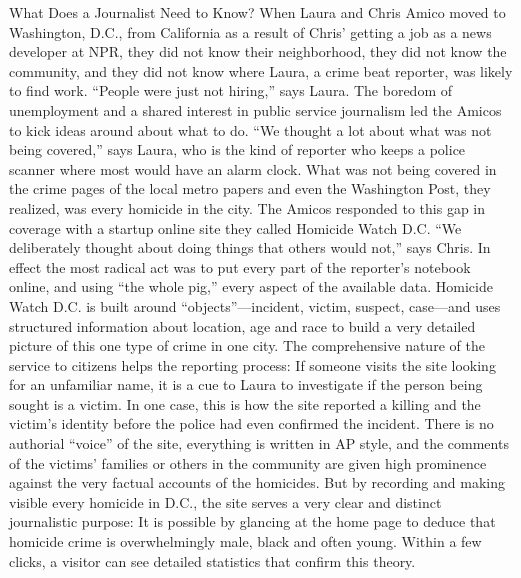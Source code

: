What Does a Journalist Need to Know?
When Laura and Chris Amico moved to Washington, D.C., from California as
a result of Chris’ getting a job as a news developer at NPR, they did not know
their neighborhood, they did not know the community, and they did not know
where Laura, a crime beat reporter, was likely to find work.
``People were just not hiring,'' says Laura. The boredom of unemployment and a
shared interest in public service journalism led the Amicos to kick ideas around
about what to do. ``We thought a lot about what was not being covered,'' says
Laura, who is the kind of reporter who keeps a police scanner where most would
have an alarm clock.
What was not being covered in the crime pages of the local metro papers and
even the Washington Post, they realized, was every homicide in the city. The
Amicos responded to this gap in coverage with a startup online site they called
Homicide Watch D.C. ``We deliberately thought about doing things that others
would not,'' says Chris. In effect the most radical act was to put every part of the
reporter’s notebook online, and using ``the whole pig,'' every aspect of the available
data. Homicide Watch D.C. is built around ``objects''—incident, victim, suspect,
case—and uses structured information about location, age and race to build
a very detailed picture of this one type of crime in one city. The comprehensive
nature of the service to citizens helps the reporting process: If someone visits the
site looking for an unfamiliar name, it is a cue to Laura to investigate if the person
being sought is a victim. In one case, this is how the site reported a killing and the
victim’s identity before the police had even confirmed the incident.
There is no authorial ``voice'' of the site, everything is written in AP style, and
the comments of the victims’ families or others in the community are given high
prominence against the very factual accounts of the homicides. But by recording
and making visible every homicide in D.C., the site serves a very clear and distinct
journalistic purpose: It is possible by glancing at the home page to deduce
that homicide crime is overwhelmingly male, black and often young. Within a
few clicks, a visitor can see detailed statistics that confirm this theory.

